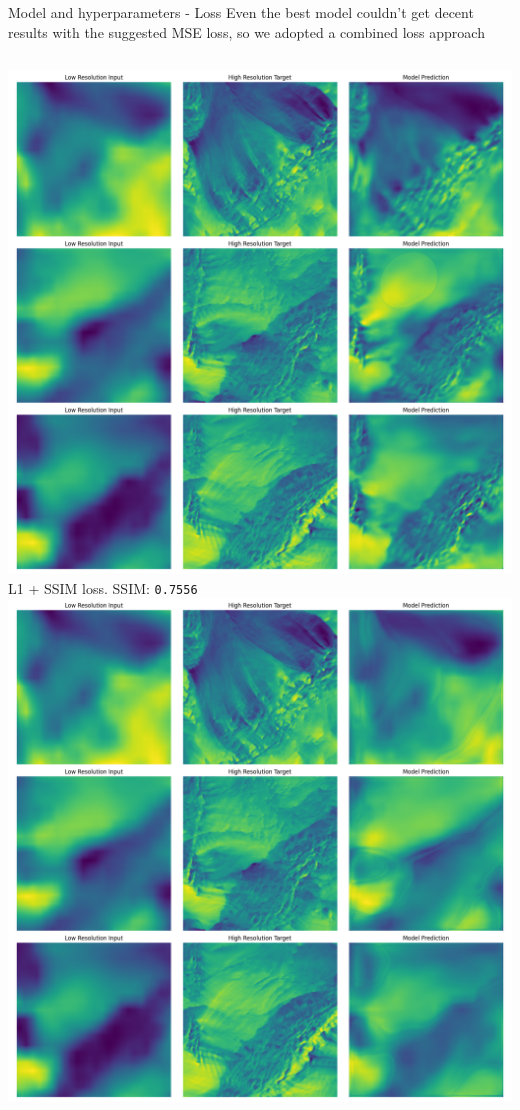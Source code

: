 \documentclass[footline=authortitle]{beamer}
\begin{document}
\begin{frame}{Model and hyperparameters - Loss}
    Even the best model couldn't get decent results with the suggested MSE loss, so we adopted a combined loss approach
    \begin{columns}
            \includegraphics[width=\linewidth]{images/unet_vectors_l1ssim_loss_200_epochs_4_batch_1em3_lr_1em5_weightdecay.png}
            \newline
            \centering \small L1 + SSIM loss. SSIM: \texttt{0.7556}
            \includegraphics[width=\linewidth]{images/unet_vectors_mse_loss_200_epochs_4_batch_1em3_lr_1em5_weightdecay.png}

\end{columns}
\end{frame}
\end{document}
